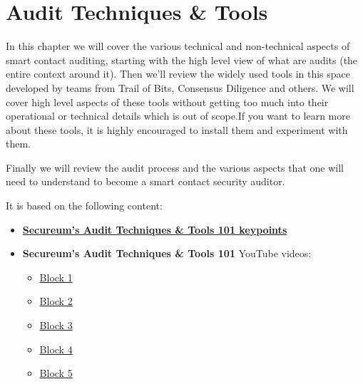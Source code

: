 \chapter{Audit Techniques \& Tools}\label{audit-techniques-tools}

In this chapter we will cover the various technical and non-technical
aspects of smart contact auditing, starting with the high level view of
what are audits (the entire context around it). Then we'll review the
widely used tools in this space developed by teams from Trail of Bits,
Consensus Diligence and others. We will cover high level aspects of
these tools without getting too much into their operational or technical
details which is out of scope.If you want to learn more about these
tools, it is highly encouraged to install them and experiment with them.

Finally we will review the audit process and the various aspects that
one will need to understand to become a smart contact security auditor.

It is based on the following content:

\begin{itemize}
\tightlist
\item
  \href{https://secureum.substack.com/p/audit-techniques-and-tools-101}{\textbf{Secureum's
  Audit Techniques \& Tools 101 keypoints}}
\item
  \textbf{Secureum's Audit Techniques \& Tools 101} YouTube videos:

  \begin{itemize}
  \tightlist
  \item
    \href{https://www.youtube.com/watch?v=M0C7z3TE5Go}{Block 1}
  \item
    \href{https://www.youtube.com/watch?v=QstpNY1IuqM}{Block 2}
  \item
    \href{https://www.youtube.com/watch?v=QmD2bJUe140}{Block 3}
  \item
    \href{https://www.youtube.com/watch?v=jZ81ebDJVe0}{Block 4}
  \item
    \href{https://www.youtube.com/watch?v=dgITqd3mkDk}{Block 5}
  \end{itemize}
\end{itemize}
